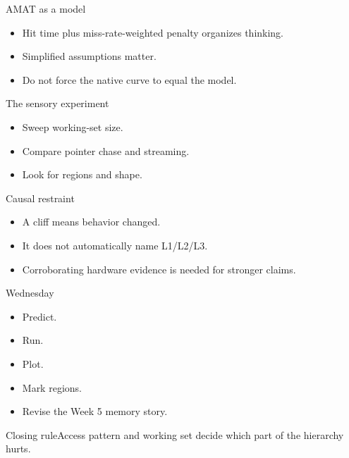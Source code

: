 \documentclass{beamer}
\begin{document}
\begin{frame}{AMAT as a model}\begin{itemize}\item Hit time plus miss-rate-weighted penalty organizes thinking.\item Simplified assumptions matter.\item Do not force the native curve to equal the model.\end{itemize}\end{frame}
\begin{frame}{The sensory experiment}\begin{itemize}\item Sweep working-set size.\item Compare pointer chase and streaming.\item Look for regions and shape.\end{itemize}\end{frame}
\begin{frame}{Causal restraint}\begin{itemize}\item A cliff means behavior changed.\item It does not automatically name L1/L2/L3.\item Corroborating hardware evidence is needed for stronger claims.\end{itemize}\end{frame}
\begin{frame}{Wednesday}\begin{itemize}\item Predict.\item Run.\item Plot.\item Mark regions.\item Revise the Week 5 memory story.\end{itemize}\end{frame}
\begin{frame}{Closing rule}\centering\Large Access pattern and working set decide which part of the hierarchy hurts.\end{frame}
\end{document}
